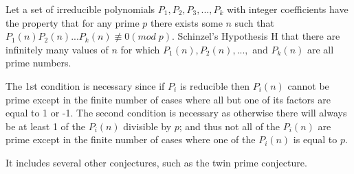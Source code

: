 \documentclass[12pt]{article}
\begin{document}
Let a set of irreducible polynomials $P_1,P_2,P_3,...,P_k$ with integer coefficients have the property that for any prime $p$ there exists some $n$ such that $P_1(n)P_2(n)...P_k(n) \not\equiv 0 (mod\; p)$.  Schinzel's Hypothesis H  that there are infinitely many values of $n$ for which $P_1(n),P_2(n),...,$ and $P_k(n)$ are all prime numbers.  

The 1st condition is necessary since if $P_i$ is reducible then $P_i(n)$ cannot be prime except in the finite number of cases where all but one of its factors are equal to 1 or -1.  The second condition is necessary as otherwise there will always be at least 1 of the $P_i(n)$ divisible by $p$; and thus not all of the $P_i(n)$ are prime except in the finite number of cases where one of the $P_i(n)$ is equal to $p$. 

It includes several other conjectures, such as the twin prime conjecture.
\end{document}
